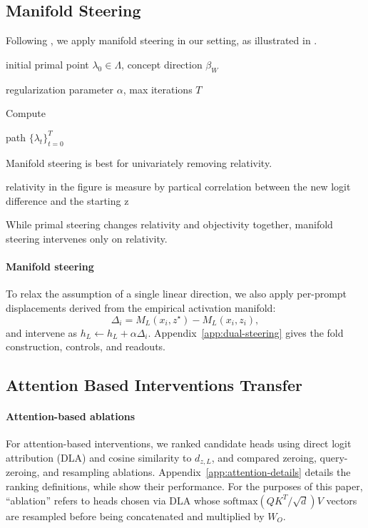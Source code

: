 \documentclass{article}
\begin{document}
\subsection{Manifold Steering}
Following \citet{sarfati2026beliefs}, we apply manifold steering in our setting, as illustrated in .

\begin{algorithm}[t]
\caption{Manifold Steering}\label{alg:manifold}
\begin{algorithmic}

 initial primal point $\lambda_0 \in \Lambda$, concept direction $\beta_W$

 regularization parameter $\alpha$, max iterations $T$

    \STATE Compute
\ENDFOR

 path $\{\lambda_t\}_{t=0}^{T}$

\end{algorithmic}
\end{algorithm}

Manifold steering is best for univariately removing relativity.

relativity in the figure is measure by partical correlation between the new logit difference and the starting z

While primal steering changes relativity and objectivity together, manifold steering intervenes only on relativity.

\paragraph{Manifold steering}
To relax the assumption of a single linear direction, we also apply per-prompt displacements derived from the empirical activation manifold:
\[
\Delta_i = M_L(x_i, z^\star) - M_L(x_i, z_i),
\]
and intervene as $h_L \leftarrow h_L + \alpha \Delta_i$.
Appendix~\ref{app:dual-steering} gives the fold construction, controls, and readouts.



\subsection{Attention Based Interventions Transfer}
\label{subsec:attention}

\paragraph{Attention-based ablations}
For attention-based interventions, we ranked candidate heads using direct logit attribution (DLA) \citep{elhage2021transformer} and cosine similarity to $d_{z,L}$, and compared zeroing, query-zeroing, and resampling ablations.
Appendix~\ref{app:attention-details} details the ranking definitions, while  show their performance. For the purposes of this paper, ``ablation'' refers to heads chosen via DLA whose $\mathrm{softmax}(QK^T/\sqrt{d}) V$ vectors are resampled before being concatenated and multiplied by $W_O$.
\end{document}
